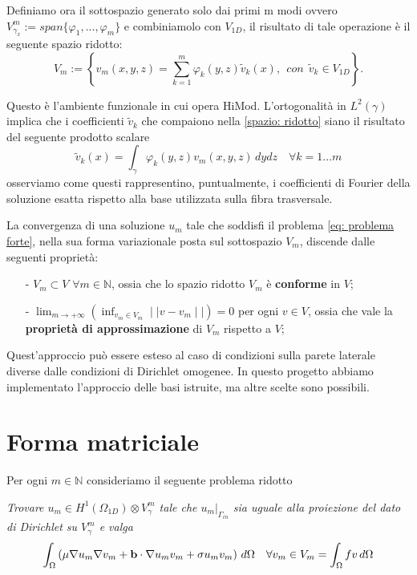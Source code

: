 Definiamo ora il sottospazio generato solo dai primi m modi ovvero  $V^m_{\gamma_x}:=span\{\varphi_1,...,\varphi_m\}$ e combiniamolo con $V_{1D}$, il risultato di tale operazione \`e il seguente spazio ridotto:
\begin{equation}
\label{spazio: ridotto}
V_m:=\left\{v_m(x,y,z)=\sum^m_{k=1}\varphi_k(y,z)\tilde{v}_k(x) ,\:\:con\:\:\tilde{v}_k\in V_{1D}\right\}.
\end{equation}

Questo \`e l'ambiente funzionale in cui opera HiMod.
L'ortogonalit\`a in $L^2(\gamma)$ implica che i coefficienti  $\tilde{v}_k$ che compaiono nella \eqref{spazio: ridotto} 
siano il risultato del seguente prodotto scalare
\begin{displaymath}
\tilde{v}_k(x)=\int_{\gamma}\varphi_k(y,z)v_m(x,y,z)\,dydz\quad\forall k=1\ldots m
\end{displaymath}
osserviamo come questi rappresentino, puntualmente, i coefficienti di Fourier della soluzione esatta rispetto alla base 
utilizzata sulla fibra trasversale.

La convergenza di una soluzione $u_m$ tale che soddisfi il problema \eqref{eq: problema forte}, nella sua forma variazionale
posta sul sottospazio $V_m$, discende dalle seguenti propriet\`a:
\begin{itemize}
\item[-] $V_m \subset V$ $\forall m\in \mathbb{N}$, ossia che lo spazio ridotto $V_m$ \`e \textbf{conforme} in $V$;
\item[-] $\displaystyle \lim_{m\to +\infty} \left(\inf_{v_m\in V_m}\mid\mid v-v_m\mid\mid\right)=0$ 
per ogni $v \in V$, ossia che vale la \textbf{propriet\`a di approssimazione} di $V_m$ rispetto a $V$;
\end{itemize}
Quest'approccio pu\`o essere esteso al caso di condizioni sulla parete laterale diverse dalle condizioni di Dirichlet omogenee.
In questo progetto abbiamo implementato l'approccio delle basi istruite, ma altre scelte sono possibili.

\section{Forma matriciale}
Per ogni $m\in\mathbb{N}$ consideriamo il seguente problema ridotto 

\noindent\emph{Trovare $u_m\in H^1(\Omega_{1D})\otimes V_{\gamma}^m$ tale che $\left.u_m\right|_{\Gamma_{in}}$ sia uguale alla proiezione del dato di Dirichlet 
su $V_\gamma^m$ e valga}
\begin{multline*}
\int_\Omega\left(\mu\nabla u_m\nabla v_m + \mathbf{b}\cdot\nabla u_mv_m+\sigma u_mv_m\right)\,d\Omega\quad \forall v_m\in V_m
=\int_\Omega fv \,d\Omega
\end{multline*}

